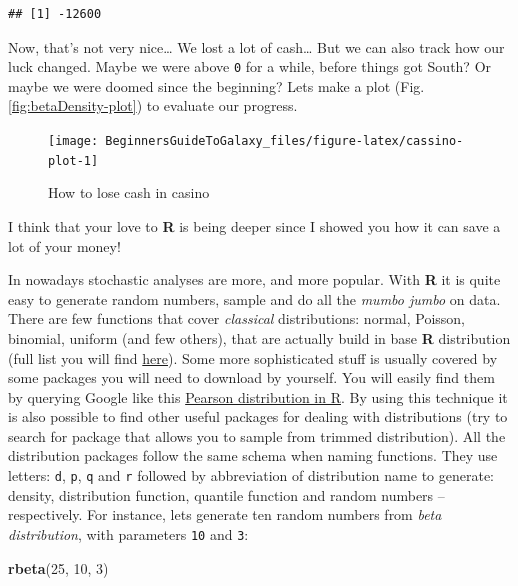 \documentclass[]{book}
\newenvironment{Shaded}{\begin{snugshade}}{\end{snugshade}}
\newcommand{\KeywordTok}[1]{\textcolor[rgb]{0.13,0.29,0.53}{\textbf{#1}}}
\newcommand{\DecValTok}[1]{\textcolor[rgb]{0.00,0.00,0.81}{#1}}
\newcommand{\NormalTok}[1]{#1}
\theoremstyle{definition}
\theoremstyle{definition}
\theoremstyle{definition}
\theoremstyle{remark}
\begin{document}
\begin{verbatim}
## [1] -12600
\end{verbatim}

Now, that's not very nice\ldots{} We lost a lot of cash\ldots{} But we
can also track how our luck changed. Maybe we were above \texttt{0} for
a while, before things got South? Or maybe we were doomed since the
beginning? Lets make a plot (Fig. \ref{fig:betaDensity-plot}) to
evaluate our progress.

\begin{figure}

{\centering \texttt{[image: BeginnersGuideToGalaxy\_files/figure-latex/cassino-plot-1]} 

}

\caption{How to lose cash in casino}\label{fig:cassino-plot}
\end{figure}

I think that your love to \textbf{R} is being deeper since I showed you
how it can save a lot of your money!

In nowadays stochastic analyses are more, and more popular. With
\textbf{R} it is quite easy to generate random numbers, sample and do
all the \emph{mumbo jumbo} on data. There are few functions that cover
\emph{classical} distributions: normal, Poisson, binomial, uniform (and
few others), that are actually build in base \textbf{R} distribution
(full list you will find
\href{https://stat.ethz.ch/R-manual/R-devel/library/stats/html/Distributions.html}{here}).
Some more sophisticated stuff is usually covered by some packages you
will need to download by yourself. You will easily find them by querying
Google like this
\href{https://www.google.com/search?client=ubuntu\&channel=fs\&q=Pearson+distribution+in+R\&ie=utf-8\&oe=utf-8\&gfe_rd=cr\&dcr=0\&ei=KTI5Ws_7LfPBXrSBr7gO}{Pearson
distribution in R}. By using this technique it is also possible to find
other useful packages for dealing with distributions (try to search for
package that allows you to sample from trimmed distribution). All the
distribution packages follow the same schema when naming functions. They
use letters: \texttt{d}, \texttt{p}, \texttt{q} and \texttt{r} followed
by abbreviation of distribution name to generate: density, distribution
function, quantile function and random numbers -- respectively. For
instance, lets generate ten random numbers from \emph{beta
distribution}, with parameters \texttt{10} and \texttt{3}:

\begin{Shaded}
\begin{Highlighting}[]
\KeywordTok{rbeta}\NormalTok{(}\DecValTok{25}\NormalTok{, }\DecValTok{10}\NormalTok{, }\DecValTok{3}\NormalTok{)}
\end{Highlighting}
\end{Shaded}
\end{document}
